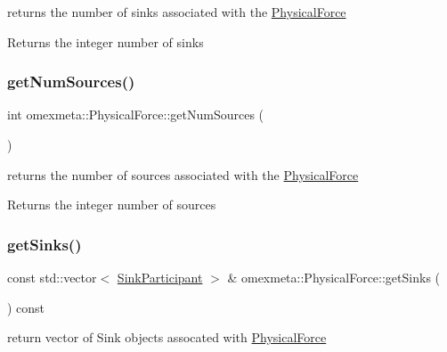returns the number of sinks associated with the \hyperlink{classomexmeta_1_1PhysicalForce}{Physical\+Force} 

\begin{DoxyReturn}{Returns}
the integer number of sinks 
\end{DoxyReturn}
\mbox{\label{classomexmeta_1_1PhysicalForce_a9910c8edac57daf70faa1f1e2e0208d1}} 
\subsubsection{\texorpdfstring{get\+Num\+Sources()}{getNumSources()}}
{\footnotesize\ttfamily int omexmeta\+::\+Physical\+Force\+::get\+Num\+Sources (\begin{DoxyParamCaption}{ }\end{DoxyParamCaption})}



returns the number of sources associated with the \hyperlink{classomexmeta_1_1PhysicalForce}{Physical\+Force} 

\begin{DoxyReturn}{Returns}
the integer number of sources 
\end{DoxyReturn}
\mbox{\label{classomexmeta_1_1PhysicalForce_ab37bbe3a0f762066fdb43e5c2ce608eb}} 
\subsubsection{\texorpdfstring{get\+Sinks()}{getSinks()}}
{\footnotesize\ttfamily const std\+::vector$<$ \hyperlink{classomexmeta_1_1SinkParticipant}{Sink\+Participant} $>$ \& omexmeta\+::\+Physical\+Force\+::get\+Sinks (\begin{DoxyParamCaption}{ }\end{DoxyParamCaption}) const}



return vector of Sink objects assocated with \hyperlink{classomexmeta_1_1PhysicalForce}{Physical\+Force} 

